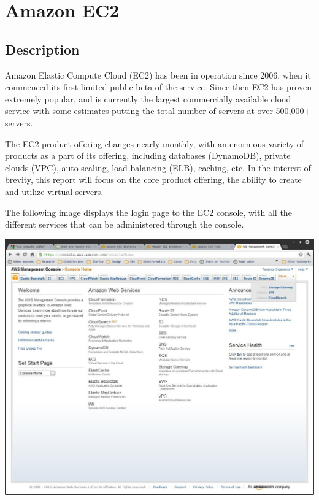 \chapter{Amazon EC2}
\section{Description}
Amazon Elastic Compute Cloud (EC2) has been in operation since 2006\ftAmOne\ftAmOneText, when it commenced its first limited public beta of the service. Since then EC2 has proven extremely popular, and is currently the largest commercially available cloud service with some estimates putting the total number of servers at over 500,000+ servers\ftAmTwo\ftAmTwoText.

The EC2 product offering changes nearly monthly, with an enormous variety of products as a part of its offering, including databases (DynamoDB), private clouds (VPC), auto scaling, load balancing (ELB), caching, etc. In the interest of brevity, this report will focus on the core product offering, the ability to create and utilize virtual servers.

The following image displays the login page to the EC2 console, with all the different services that can be administered through the console.

\begin{center}
\includegraphics[scale=0.3]{figs/EC2console.jpg}
\end{center}

